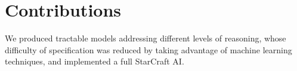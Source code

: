 \section{Contributions}

We produced tractable models addressing different levels of reasoning, whose difficulty of specification was reduced by taking advantage of machine learning techniques, and implemented a full StarCraft AI.

